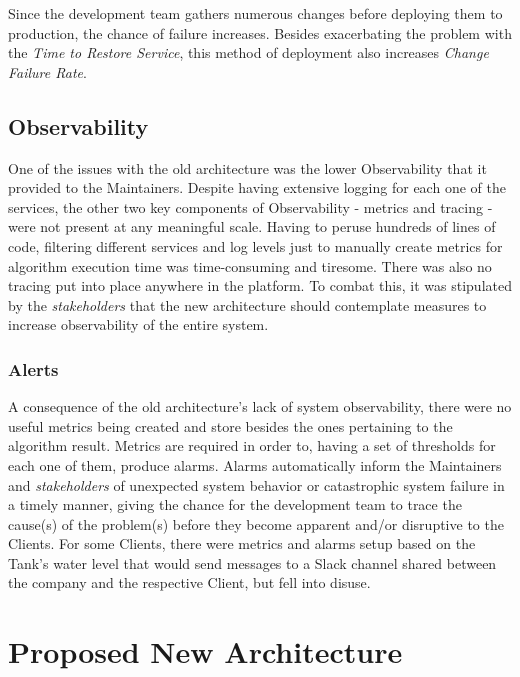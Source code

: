Since the development team gathers numerous changes before deploying them to production, the chance of failure increases. Besides exacerbating the problem with the \textit{Time to Restore Service}, this method of deployment also increases \textit{Change Failure Rate}.



\subsection{Observability}\label{methodology:ss:observability}

One of the issues with the old architecture was the lower Observability that it provided to the Maintainers. Despite having extensive logging for each one of the services, the other two key components of Observability - metrics and tracing - were not present at any meaningful scale. Having to peruse hundreds of lines of code, filtering different services and log levels just to manually create metrics for algorithm execution time was time-consuming and tiresome. There was also no tracing put into place anywhere in the platform. To combat this, it was stipulated by the \textit{stakeholders} that the new architecture should contemplate measures to increase observability of the entire system.

\subsubsection{Alerts}\label{methodology:sss:alerts}
A consequence of the old architecture's lack of system observability, there were no useful metrics being created and store besides the ones pertaining to the algorithm result. Metrics are required in order to, having a set of thresholds for each one of them, produce alarms. Alarms automatically inform the Maintainers and \textit{stakeholders} of unexpected system behavior or catastrophic system failure in a timely manner, giving the chance for the development team to trace the cause(s) of the problem(s) before they become apparent and/or disruptive to the Clients. For some Clients, there were metrics and alarms setup based on the Tank's water level that would send messages to a Slack channel shared between the company and the respective Client, but fell into disuse.


\section{Proposed New Architecture}\label{methodology:s:proposed-new-architecture}

